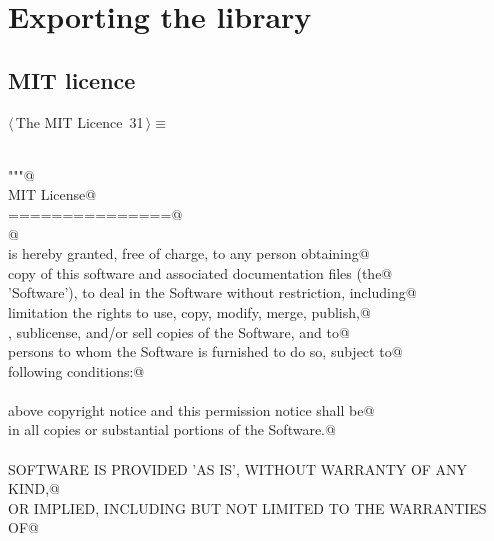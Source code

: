 \documentclass[11pt,oneside]{article}	%
\begin{document}
\section{Exporting the library}

\subsection{MIT licence}
\begin{flushleft} \small \label{scrap54}
\protect{}$\langle\,$The MIT Licence\nobreak\ {\footnotesize 31}$\,\rangle\equiv$
\vspace{-1ex}
\begin{list}{}{} \item
\mbox{}\verb@@\\
\mbox{}\verb@"""@\\
\mbox{}\verb@The MIT License@\\
\mbox{}\verb@===============@\\
\mbox{}\verb@    @\\
\mbox{}\verb@Permission is hereby granted, free of charge, to any person obtaining@\\
\mbox{}\verb@a copy of this software and associated documentation files (the@\\
\mbox{}\verb@'Software'), to deal in the Software without restriction, including@\\
\mbox{}\verb@without limitation the rights to use, copy, modify, merge, publish,@\\
\mbox{}\verb@distribute, sublicense, and/or sell copies of the Software, and to@\\
\mbox{}\verb@permit persons to whom the Software is furnished to do so, subject to@\\
\mbox{}\verb@the following conditions:@\\
\mbox{}\verb@@\\
\mbox{}\verb@The above copyright notice and this permission notice shall be@\\
\mbox{}\verb@included in all copies or substantial portions of the Software.@\\
\mbox{}\verb@@\\
\mbox{}\verb@THE SOFTWARE IS PROVIDED 'AS IS', WITHOUT WARRANTY OF ANY KIND,@\\
\mbox{}\verb@EXPRESS OR IMPLIED, INCLUDING BUT NOT LIMITED TO THE WARRANTIES OF@\\

\end{list}
\end{flushleft}
\end{document}
